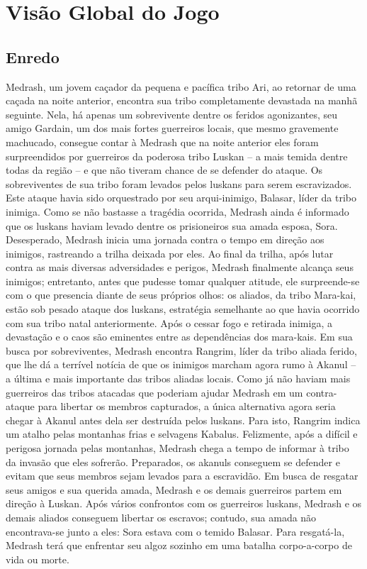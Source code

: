 \section{Visão Global do Jogo}

\subsection{Enredo}
	Medrash, um jovem caçador da pequena e pacífica tribo Ari, ao retornar de uma caçada na noite anterior, encontra sua tribo completamente devastada na manhã seguinte. Nela, há apenas um sobrevivente dentre os feridos agonizantes, seu amigo Gardain, um dos mais fortes guerreiros locais, que mesmo gravemente machucado, consegue contar à Medrash que na noite anterior eles foram surpreendidos por guerreiros da poderosa tribo Luskan – a mais temida dentre todas da região – e que não tiveram chance de se defender do ataque. Os sobreviventes de sua tribo foram levados pelos luskans para serem escravizados. Este ataque havia sido orquestrado por seu arqui-inimigo, Balasar, líder da tribo inimiga. Como se não bastasse a tragédia ocorrida, Medrash ainda é informado que os luskans haviam levado dentre os prisioneiros sua amada esposa, Sora.  Desesperado, Medrash inicia uma jornada contra o tempo em direção aos inimigos, rastreando a trilha deixada por eles.
	Ao final da trilha, após lutar contra as mais diversas adversidades e perigos, Medrash finalmente alcança seus inimigos; entretanto, antes que pudesse tomar qualquer atitude, ele  surpreende-se com o que presencia diante de seus próprios olhos: os aliados, da tribo Mara-kai, estão sob pesado ataque dos luskans, estratégia semelhante ao que havia ocorrido com sua tribo natal anteriormente. Após o cessar fogo e retirada inimiga, a devastação e o caos são eminentes entre as dependências dos mara-kais. Em sua busca por sobreviventes, Medrash encontra Rangrim, líder da tribo aliada ferido, que lhe dá a terrível notícia de que os inimigos marcham agora rumo à Akanul – a última e mais importante das tribos aliadas locais. Como já não haviam mais guerreiros das tribos atacadas que poderiam ajudar Medrash em um contra-ataque para libertar os membros capturados, a única alternativa agora seria chegar à Akanul antes dela ser destruída pelos luskans. Para isto, Rangrim indica um atalho pelas montanhas frias e selvagens Kabalus.
	Felizmente, após a difícil e perigosa jornada pelas montanhas, Medrash chega a tempo de informar à tribo da invasão que eles sofrerão. Preparados, os akanuls conseguem se defender e evitam que seus membros sejam levados para a escravidão. Em busca de resgatar seus amigos e sua querida amada, Medrash e os demais guerreiros partem em direção à Luskan. Após vários confrontos com os guerreiros luskans, Medrash e os demais aliados conseguem libertar os escravos; contudo, sua amada não encontrava-se junto a eles: Sora estava com o temido Balasar. Para resgatá-la, Medrash terá que enfrentar seu algoz sozinho em uma batalha corpo-a-corpo de vida ou morte.
